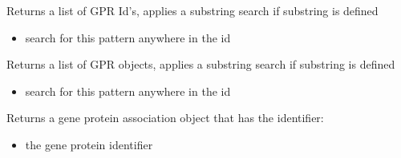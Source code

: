 \documentclass[letterpaper,10pt,english]{sphinxmanual}
\begin{document}
\begin{fulllineitems}
\begin{fulllineitems}
\begin{itemize}
\end{itemize}

\end{fulllineitems}


\begin{fulllineitems}
\label{\detokenize{modules_doc:cbmpy.CBModel.Model.getGPRIds}}
\pysigstartsignatures
{}
\pysigstopsignatures
\sphinxAtStartPar
Returns a list of GPR Id’s, applies a substring search if substring is defined
\begin{itemize}
\item {} 
\sphinxAtStartPar
{} search for this pattern anywhere in the id

\end{itemize}

\end{fulllineitems}


\begin{fulllineitems}
\label{\detokenize{modules_doc:cbmpy.CBModel.Model.getGPRObjects}}
\pysigstartsignatures
{}
\pysigstopsignatures
\sphinxAtStartPar
Returns a list of GPR objects, applies a substring search if substring is defined
\begin{itemize}
\item {} 
\sphinxAtStartPar
{} search for this pattern anywhere in the id

\end{itemize}

\end{fulllineitems}


\begin{fulllineitems}
\label{\detokenize{modules_doc:cbmpy.CBModel.Model.getGPRassociation}}
\pysigstartsignatures
{}
\pysigstopsignatures
\sphinxAtStartPar
Returns a gene protein association object that has the identifier:
\begin{itemize}
\item {} 
\sphinxAtStartPar
{} the gene protein identifier


\end{itemize}
\end{fulllineitems}
\end{fulllineitems}
\end{document}

